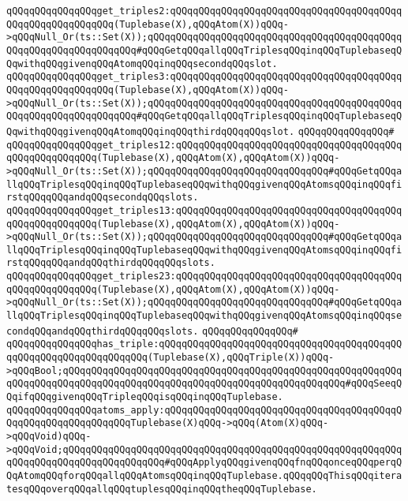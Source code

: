 \verb|qQQqqQQqqQQqqQQqget_triples2:qQQqqQQqqQQqqQQqqQQqqQQqqQQqqQQqqQQqqQQqqQQqqQQqqQQqqQQqqQQq(Tuplebase(X),qQQqAtom(X))qQQq->qQQqNull_Or(ts::Set(X));qQQqqQQqqQQqqQQqqQQqqQQqqQQqqQQqqQQqqQQqqQQqqQQqqQQqqQQqqQQqqQQqqQQq#qQQqGetqQQqallqQQqTriplesqQQqinqQQqTuplebaseqQQqwithqQQqgivenqQQqAtomqQQqinqQQqsecondqQQqslot.|\newline
\verb|qQQqqQQqqQQqqQQqget_triples3:qQQqqQQqqQQqqQQqqQQqqQQqqQQqqQQqqQQqqQQqqQQqqQQqqQQqqQQqqQQq(Tuplebase(X),qQQqAtom(X))qQQq->qQQqNull_Or(ts::Set(X));qQQqqQQqqQQqqQQqqQQqqQQqqQQqqQQqqQQqqQQqqQQqqQQqqQQqqQQqqQQqqQQqqQQq#qQQqGetqQQqallqQQqTriplesqQQqinqQQqTuplebaseqQQqwithqQQqgivenqQQqAtomqQQqinqQQqthirdqQQqqQQqslot.|\newline
\verb|qQQqqQQqqQQqqQQq#|\newline
\verb|qQQqqQQqqQQqqQQqget_triples12:qQQqqQQqqQQqqQQqqQQqqQQqqQQqqQQqqQQqqQQqqQQqqQQqqQQqqQQq(Tuplebase(X),qQQqAtom(X),qQQqAtom(X))qQQq->qQQqNull_Or(ts::Set(X));qQQqqQQqqQQqqQQqqQQqqQQqqQQqqQQq#qQQqGetqQQqallqQQqTriplesqQQqinqQQqTuplebaseqQQqwithqQQqgivenqQQqAtomsqQQqinqQQqfirstqQQqqQQqandqQQqsecondqQQqslots.|\newline
\verb|qQQqqQQqqQQqqQQqget_triples13:qQQqqQQqqQQqqQQqqQQqqQQqqQQqqQQqqQQqqQQqqQQqqQQqqQQqqQQq(Tuplebase(X),qQQqAtom(X),qQQqAtom(X))qQQq->qQQqNull_Or(ts::Set(X));qQQqqQQqqQQqqQQqqQQqqQQqqQQqqQQq#qQQqGetqQQqallqQQqTriplesqQQqinqQQqTuplebaseqQQqwithqQQqgivenqQQqAtomsqQQqinqQQqfirstqQQqqQQqandqQQqthirdqQQqqQQqslots.|\newline
\verb|qQQqqQQqqQQqqQQqget_triples23:qQQqqQQqqQQqqQQqqQQqqQQqqQQqqQQqqQQqqQQqqQQqqQQqqQQqqQQq(Tuplebase(X),qQQqAtom(X),qQQqAtom(X))qQQq->qQQqNull_Or(ts::Set(X));qQQqqQQqqQQqqQQqqQQqqQQqqQQqqQQq#qQQqGetqQQqallqQQqTriplesqQQqinqQQqTuplebaseqQQqwithqQQqgivenqQQqAtomsqQQqinqQQqsecondqQQqandqQQqthirdqQQqqQQqslots.|\newline
\verb|qQQqqQQqqQQqqQQq#|\newline
\verb|qQQqqQQqqQQqqQQqhas_triple:qQQqqQQqqQQqqQQqqQQqqQQqqQQqqQQqqQQqqQQqqQQqqQQqqQQqqQQqqQQqqQQqqQQq(Tuplebase(X),qQQqTriple(X))qQQq->qQQqBool;qQQqqQQqqQQqqQQqqQQqqQQqqQQqqQQqqQQqqQQqqQQqqQQqqQQqqQQqqQQqqQQqqQQqqQQqqQQqqQQqqQQqqQQqqQQqqQQqqQQqqQQqqQQqqQQqqQQqqQQq#qQQqSeeqQQqifqQQqgivenqQQqTripleqQQqisqQQqinqQQqTuplebase.|\newline
\newline
\verb|qQQqqQQqqQQqqQQqatoms_apply:qQQqqQQqqQQqqQQqqQQqqQQqqQQqqQQqqQQqqQQqqQQqqQQqqQQqqQQqqQQqqQQqTuplebase(X)qQQq->qQQq(Atom(X)qQQq->qQQqVoid)qQQq->qQQqVoid;qQQqqQQqqQQqqQQqqQQqqQQqqQQqqQQqqQQqqQQqqQQqqQQqqQQqqQQqqQQqqQQqqQQqqQQqqQQqqQQqqQQqqQQq#qQQqApplyqQQqgivenqQQqfnqQQqonceqQQqperqQQqAtomqQQqforqQQqallqQQqAtomsqQQqinqQQqTuplebase.qQQqqQQqThisqQQqiteratesqQQqoverqQQqallqQQqtuplesqQQqinqQQqtheqQQqTuplebase.|\newline
